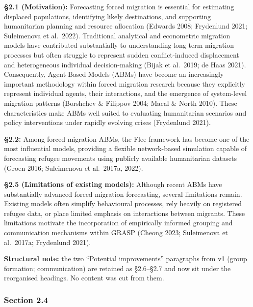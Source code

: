 \documentclass[11pt,a4paper]{article}
\begin{document}
\vspace{0.3cm}
\begin{updatebox}
\textbf{§2.1 (Motivation):} Forecasting forced migration is essential for estimating displaced populations, identifying
likely destinations, and supporting humanitarian planning and resource allocation (Edwards 2008; Frydenlund 2021;
Suleimenova et al.\ 2022). Traditional analytical and econometric migration models have contributed substantially to
understanding long-term migration processes but often struggle to represent sudden conflict-induced displacement and
heterogeneous individual decision-making (Bijak et al.\ 2019; de Haas 2021). Consequently, Agent-Based Models (ABMs) have
become an increasingly important methodology within forced migration research because they explicitly represent individual
agents, their interactions, and the emergence of system-level migration patterns (Borshchev \& Filippov 2004; Macal \&
North 2010). These characteristics make ABMs well suited to evaluating humanitarian scenarios and policy interventions under
rapidly evolving crises (Frydenlund 2021).

\medbreak
\textbf{§2.2:} Among forced migration ABMs, the Flee framework has become one of the most influential models, providing a
flexible network-based simulation capable of forecasting refugee movements using publicly available humanitarian datasets
(Groen 2016; Suleimenova et al.\ 2017a, 2022).

\medbreak
\textbf{§2.5 (Limitations of existing models):} Although recent ABMs have substantially advanced forced migration
forecasting, several limitations remain. Existing models often simplify behavioural processes, rely heavily on registered
refugee data, or place limited emphasis on interactions between migrants. These limitations motivate the incorporation of
empirically informed grouping and communication mechanisms within GRASP (Cheong 2023; Suleimenova et al.\ 2017a;
Frydenlund 2021).
\end{updatebox}

\vspace{0.2cm}
\begin{authorbox}
\textbf{Structural note:} the two ``Potential improvements'' paragraphs from v1 (group formation; communication) are
retained as §2.6--§2.7 and now sit under the reorganised headings. No content was cut from them.
\end{authorbox}

\subsubsection*{Section 2.4}
\end{document}
